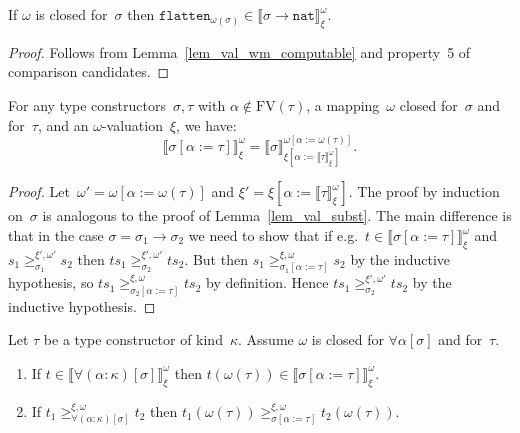 \documentclass[runningheads,a4paper]{llncs}
\newcommand{\arrtype}{\rightarrow}
\newcommand{\subst}[2]{#1:=#2}
\newcommand{\FV}{\mathrm{FV}}
\newcommand{\nat}{\mathtt{nat}}
\newcommand{\flatten}{\mathtt{flatten}}
\newcommand{\val}[3]{\ensuremath{\llbracket#1\rrbracket_{#2}^{#3}}}
\newcommand{\gteq}[3]{\ensuremath{\ge_{#1}^{#2,#3}}}
\begin{document}
\begin{lemma}\label{lem_wm_flatten}
  If $\omega$ is closed for~$\sigma$ then $\flatten_{\omega(\sigma)}
  \in \val{\sigma\arrtype\nat}{\xi}{\omega}$.
\end{lemma}

\begin{proof}
  Follows from Lemma~\ref{lem_val_wm_computable} and property~5 of
  comparison candidates.
\end{proof}

\begin{lemma}\label{lem_val_subst_wm}
  For any type constructors~$\sigma,\tau$ with $\alpha \notin
  \FV(\tau)$, a mapping~$\omega$ closed for~$\sigma$ and for~$\tau$,
  and an $\omega$-valuation~$\xi$, we have:
  \[
  \val{\sigma[\subst{\alpha}{\tau}]}{\xi}{\omega} =
  \val{\sigma}{\xi[\subst{\alpha}{\val{\tau}{\xi}{\omega}}]}{\omega[\subst{\alpha}{\omega(\tau)}]}.
  \]
\end{lemma}

\begin{proof}
  Let~$\omega' = \omega[\subst{\alpha}{\omega(\tau)}]$ and $\xi' =
  \xi[\subst{\alpha}{\val{\tau}{\xi}{\omega}}]$. The proof by
  induction on~$\sigma$ is analogous to the proof of
  Lemma~\ref{lem_val_subst}. The main difference is that in the case
  $\sigma = \sigma_1\arrtype\sigma_2$ we need to show that if e.g.~$t
  \in \val{\sigma[\subst{\alpha}{\tau}]}{\xi}{\omega}$ and $s_1
  \gteq{\sigma_1}{\xi'}{\omega'} s_2$ then $t s_1
  \gteq{\sigma_2}{\xi'}{\omega'} t s_2$. But then $s_1
  \gteq{\sigma_1[\subst{\alpha}{\tau}]}{\xi}{\omega} s_2$ by the
  inductive hypothesis, so $t s_1
  \gteq{\sigma_2[\subst{\alpha}{\tau}]}{\xi}{\omega} t s_2$ by
  definition. Hence $t s_1 \gteq{\sigma_2}{\xi'}{\omega'} t s_2$ by
  the inductive hypothesis.
\end{proof}

\begin{lemma}\label{lem_wm_forall}
  Let $\tau$ be a type constructor of kind~$\kappa$. Assume $\omega$
  is closed for $\forall\alpha[\sigma]$ and for~$\tau$.
  \begin{enumerate}
  \item If $t \in \val{\forall(\alpha:\kappa)[\sigma]}{\xi}{\omega}$
    then $t (\omega(\tau)) \in
    \val{\sigma[\subst{\alpha}{\tau}]}{\xi}{\omega}$.
  \item If $t_1 \gteq{\forall(\alpha:\kappa)[\sigma]}{\xi}{\omega}
    t_2$ then $t_1 (\omega(\tau))
    \gteq{\sigma[\subst{\alpha}{\tau}]}{\xi}{\omega} t_2
    (\omega(\tau))$.
  \end{enumerate}
\end{lemma}
\end{document}
